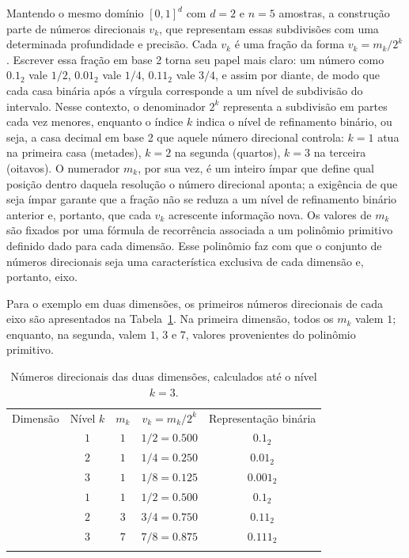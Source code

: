\documentclass[12pt,a4paper]{article}
\begin{document}
Mantendo o mesmo domínio $[0,1]^d$ com $d=2$ e $n=5$  amostras, a construção parte de números direcionais $v_k$, que representam essas subdivisões com uma determinada profundidade e precisão. Cada $v_k$ é uma fração da forma
$ v_k = m_k/2^k $.
Escrever essa fração em base 2 torna seu papel mais claro: um número como $0.1_2$ vale $1/2$, $0.01_2$ vale $1/4$, $0.11_2$ vale $3/4$, e assim por diante, de modo que cada casa binária após a vírgula corresponde a um nível de subdivisão do intervalo. Nesse contexto, o denominador $2^k$ representa a subdivisão em partes cada vez menores, enquanto o índice $k$ indica o nível de refinamento binário, ou seja, a casa decimal em base 2 que aquele número direcional controla: $k=1$ atua na primeira casa (metades), $k=2$ na segunda (quartos), $k=3$ na terceira (oitavos). O numerador $m_k$, por sua vez, é um inteiro ímpar que define qual posição dentro daquela resolução o número direcional aponta; a exigência de que seja ímpar garante que a fração não se reduza a um nível de refinamento binário anterior e, portanto, que cada $v_k$ acrescente informação nova. Os valores de $m_k$ são fixados por uma fórmula de recorrência associada a um polinômio primitivo definido dado para cada dimensão. Esse polinômio faz com que o conjunto de números direcionais seja uma característica exclusiva de cada dimensão e, portanto, eixo.

Para o exemplo em duas dimensões, os primeiros números direcionais de cada eixo são apresentados na Tabela~\ref{tab:direction}. Na primeira dimensão, todos os $m_k$ valem $1$; enquanto, na segunda, valem $1$, $3$ e $7$, valores provenientes do polinômio primitivo.

\begin{table}[htbp]
    \centering
    \begin{tabular}{c c c c c}
        \hline
        \addlinespace
        Dimensão & Nível $k$ & $m_k$ & $v_k = m_k/2^k$ & Representação binária \\
        \addlinespace
        \hline
        \addlinespace
        \multirow{3}{*}{$1$} & $1$ & $1$ & $1/2 = 0.500$ & $0.1_2$ \\
                             & $2$ & $1$ & $1/4 = 0.250$ & $0.01_2$ \\
                             & $3$ & $1$ & $1/8 = 0.125$ & $0.001_2$ \\
        \addlinespace                     
        \hline
        \addlinespace
        \multirow{3}{*}{$2$} & $1$ & $1$ & $1/2 = 0.500$ & $0.1_2$ \\
                             & $2$ & $3$ & $3/4 = 0.750$ & $0.11_2$ \\
                             & $3$ & $7$ & $7/8 = 0.875$ & $0.111_2$ \\
        \addlinespace                     
        \hline
        
    \end{tabular}
    \caption{Números direcionais das duas dimensões, calculados até o nível $k=3$.}
    \label{tab:direction}
\end{table}
\end{document}
